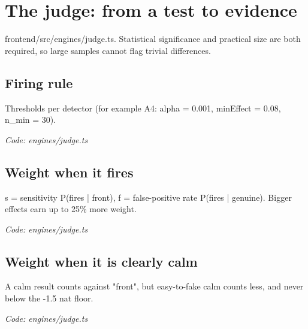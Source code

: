 \documentclass[11pt,a4paper]{article}
\newcommand{\where}[1]{\par{\small\itshape\color{mute}Code: #1}\par}
\begin{document}
\clearpage
\section{The judge: from a test to evidence}
{\color{mute}frontend/src/engines/judge.ts. Statistical significance and practical size are both required, so large samples cannot flag trivial differences.}

\subsection*{Firing rule}
\par\smallskip\noindent{}\par\smallskip
Thresholds per detector (for example A4: alpha = 0.001, minEffect = 0.08, n\_min = 30).
\where{engines/judge.ts}

\subsection*{Weight when it fires}
\par\smallskip\noindent{}\par\smallskip
s = sensitivity P(fires | front), f = false-positive rate P(fires | genuine). Bigger effects earn up to 25\% more weight.
\where{engines/judge.ts}

\subsection*{Weight when it is clearly calm}
\par\smallskip\noindent{}\par\smallskip
\par\smallskip\noindent{}\par\smallskip
A calm result counts against "front", but easy-to-fake calm counts less, and never below the -1.5 nat floor.
\where{engines/judge.ts}
\end{document}
